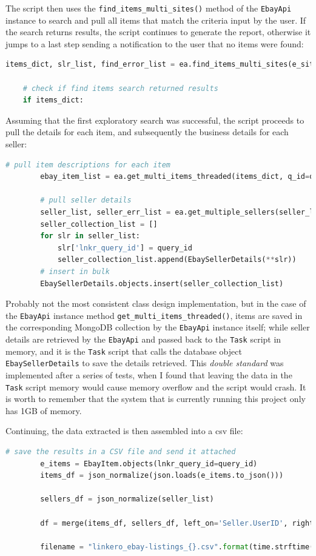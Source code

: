 The script then uses the \texttt{find\_items\_multi\_sites()} method of the
\texttt{EbayApi} instance to search and pull all items that match the criteria
input by the user. If the search returns results, the script continues to
generate the report, otherwise it jumps to a last step sending a notification
to the user that no items were found:
 \begin{lstlisting}[language=Python, breaklines=true]
    items_dict, slr_list, find_error_list = ea.find_items_multi_sites(e_sites=ebay_sites, kwd=keywords, s_id=seller_id, s_desc=search_desc)
    
    # check if find items search returned results
    if items_dict:
\end{lstlisting}

Assuming that the first exploratory search was successful, the script proceeds
to pull the details for each item, and subsequently the business details for
each seller:
\begin{lstlisting}[language=Python, breaklines=true]
		# pull item descriptions for each item
		ebay_item_list = ea.get_multi_items_threaded(items_dict, q_id=query_id)
        
        # pull seller details
        seller_list, seller_err_list = ea.get_multiple_sellers(seller_list=slr_list)
        seller_collection_list = []
        for slr in seller_list:
            slr['lnkr_query_id'] = query_id
            seller_collection_list.append(EbaySellerDetails(**slr))
        # insert in bulk
        EbaySellerDetails.objects.insert(seller_collection_list)
\end{lstlisting}
Probably not the most consistent class design implementation, but in the case of
the \texttt{EbayApi} instance method \texttt{get\_multi\_items\_threaded()},
items are saved in the corresponding MongoDB collection by the \texttt{EbayApi}
instance itself; while seller details are retrieved by the \texttt{EbayApi} and
passed back to the \texttt{Task} script in memory, and it is the \texttt{Task}
script that calls the database object \texttt{EbaySellerDetails} to save the
details retrieved. This \emph{double standard} was implemented after a series of
tests, when I found that leaving the data in the \texttt{Task} script memory
would cause memory overflow and the script would crash. It is worth to remember
that the system that is currently running this project only has 1GB of memory.

Continuing, the data extracted is then assembled into a csv file:
\begin{lstlisting}[language=Python, breaklines=true]
        # save the results in a CSV file and send it attached
        e_items = EbayItem.objects(lnkr_query_id=query_id)
        items_df = json_normalize(json.loads(e_items.to_json()))
        
        sellers_df = json_normalize(seller_list)
        
        df = merge(items_df, sellers_df, left_on='Seller.UserID', right_on='UserID')
        
        filename = "linkero_ebay-listings_{}.csv".format(time.strftime("%Y%m%d-%H%M"))
\end{lstlisting}

